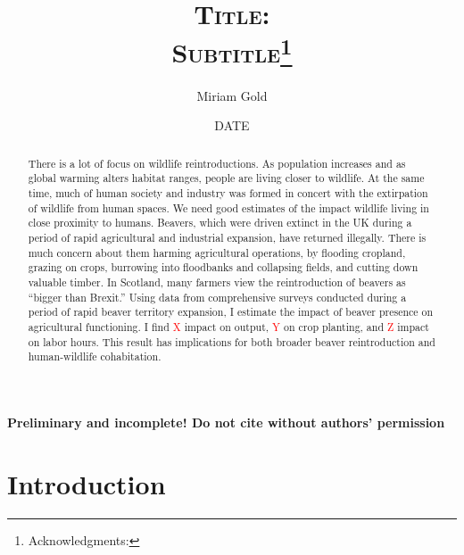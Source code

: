 \documentclass[11pt, english, letterpaper]{article}
\begin{document}
\justifying

\title{\vspace{-2em}\textsc{Title: \\ Subtitle}\thanks{Acknowledgments: }}

\author[1]{\small Miriam Gold}

\date{DATE}
\maketitle

\begin{center}
\vspace{-3em}
\textbf{Preliminary and incomplete! Do not cite without authors' permission}
\end{center}

\begin{abstract}
    \singlespacing 
    There is a lot of focus on wildlife reintroductions. As population increases and as global warming alters habitat ranges, people are living closer to wildlife. At the same time, much of human society and industry was formed in concert with the extirpation of wildlife from human spaces. We need good estimates of the impact wildlife living in close proximity to humans. Beavers, which were driven extinct in the UK during a period of rapid agricultural and industrial expansion, have returned illegally. There is much concern about them harming agricultural operations, by flooding cropland, grazing on crops, burrowing into floodbanks and collapsing fields, and cutting down valuable timber. In Scotland, many farmers view the reintroduction of beavers as ``bigger than Brexit.'' Using data from comprehensive surveys conducted during a period of rapid beaver territory expansion, I estimate the impact of beaver presence on agricultural functioning. I find \textcolor{red}{X} impact on output, \textcolor{red}{Y} on crop planting, and \textcolor{red}{Z} impact on labor hours. This result has implications for both broader beaver reintroduction and human-wildlife cohabitation. 
\end{abstract}

\newpage 

% 

\vspace{-5mm} \section{Introduction}
\label{sec:intro}

\end{document}
